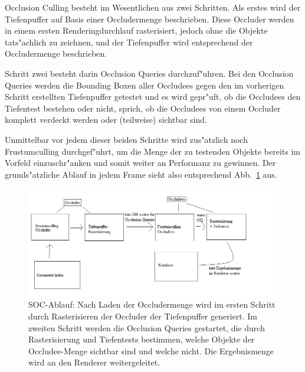\documentclass[journal]{vgtc}
\begin{document}
Occlusion Culling besteht im Wesentlichen aus zwei Schritten. Als erstes wird der Tiefenpuffer auf Basis einer Occludermenge beschrieben. Diese Occluder werden in einem ersten Renderingdurchlauf rasterisiert, jedoch ohne die Objekte tats"achlich zu zeichnen, und der Tiefenpuffer wird entsprechend der Occludermenge beschrieben.

Schritt zwei besteht darin Occlusion Queries durchzuf"uhren. Bei den Occlusion Queries werden die Bounding Boxen aller Occludees gegen den im vorherigen Schritt erstellten Tiefenpuffer getestet und es wird gepr"uft, ob die Occludees den Tiefentest bestehen oder nicht, sprich, ob die Occludees von einem Occluder komplett verdeckt werden oder (teilweise) sichtbar sind.

Unmittelbar vor jedem dieser beiden Schritte wird zus"atzlich noch Frustumculling durchgef"uhrt, um die Menge der zu testenden Objekte bereits im Vorfeld einzuschr"anken und somit weiter an Performanz zu gewinnen. Der grunds"atzliche Ablauf in jedem Frame sieht also entsprechend Abb.\ \ref{fig:socablauf} aus.
\begin{figure}%
\includegraphics[width=\columnwidth]{images/SOCAblauf2.png}%
\caption{SOC-Ablauf: Nach Laden der Occludermenge wird im ersten Schritt durch Rasterisieren der Occluder der Tiefenpuffer generiert. Im zweiten Schritt werden die Occlusion Queries gestartet, die durch Rasterisierung und Tiefentests bestimmen, welche Objekte der Occludee-Menge sichtbar sind und welche nicht. Die Ergebnismenge wird an den Renderer weitergeleitet.}%
\label{fig:socablauf}%
\end{figure}
\end{document}
